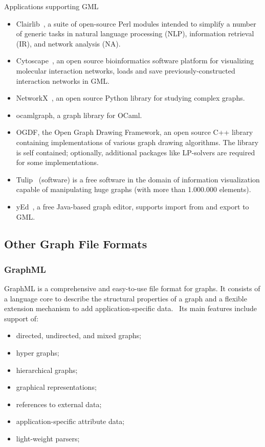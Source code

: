 Applications supporting GML~\cite{GML_wiki}

\begin{itemize}
\item Clairlib~\cite{clairlib}, a suite of open-source Perl modules intended to simplify a number of generic tasks in natural language processing (NLP), information retrieval (IR), and network analysis (NA).
\item Cytoscape~\cite{Cytoscape}, an open source bioinformatics software platform for visualizing molecular interaction networks, loads and save previously-constructed interaction networks in GML.
\item NetworkX~\cite{NetworkX}, an open source Python library for studying complex graphs.
\item ocamlgraph\cite{ocamlgraph}, a graph library for OCaml.
\item OGDF\cite{OGDF}, the Open Graph Drawing Framework, an open source C++ library containing implementations of various graph drawing algorithms. The library is self contained; optionally, additional packages like LP-solvers are required for some implementations.
\item Tulip~\cite{Tulip} (software) is a free software in the domain of information visualization capable of manipulating huge graphs (with more than 1.000.000 elements).
\item yEd~\cite{yed}, a free Java-based graph editor, supports import from and export to GML.
\end{itemize}

\subsection{Other Graph File Formats}

\subsubsection{GraphML}
GraphML is a comprehensive and easy-to-use file format for graphs. It consists of a language core to describe the structural properties of a graph and a flexible extension mechanism to add application-specific data.~\cite{GraphML} Its main features include support of:
\begin{itemize}
\item directed, undirected, and mixed graphs;
\item hyper graphs;
\item hierarchical graphs;
\item graphical representations;
\item references to external data;
\item application-specific attribute data;
\item light-weight parsers;
\end{itemize}

